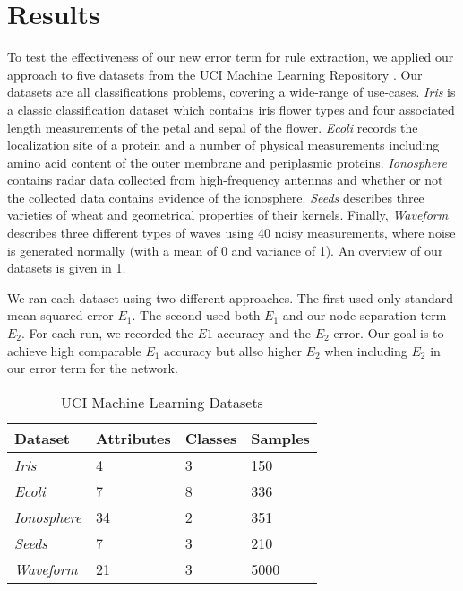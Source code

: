 \section{Results}
\label{sec:results}

To test the effectiveness of our new error term for rule extraction,
we applied our approach to five 
datasets from the UCI Machine Learning Repository \cite{uci}. Our
datasets are all classifications problems, covering a wide-range of
use-cases. \textit{Iris} is a classic classification dataset which
contains iris flower types and four associated length
measurements of the petal and sepal of the flower. \textit{Ecoli}
records the localization site of a protein and a number of
physical measurements including amino acid content of the outer membrane
and periplasmic proteins. \textit{Ionosphere} contains radar data collected
from high-frequency antennas and whether or not the collected data
contains evidence of the ionosphere. \textit{Seeds} describes three
varieties of wheat and geometrical properties of their kernels.
Finally, \textit{Waveform} describes three different types of waves
using 40 noisy measurements, where noise is generated normally
(with a mean of 0 and variance of 1).
An overview of our datasets is given in \ref{tab:datasets}.

We ran each dataset using two different approaches. The first
used only standard mean-squared error $E_1$. The second used both
$E_1$ and our node separation term $E_2$. For each run, we recorded
the $E1$ accuracy and the $E_2$ error. Our goal is to achieve
high comparable $E_1$ accuracy but allso higher $E_2$ when including
$E_2$ in our error term for the network.

\begin{table}[]
  \centering
\begin{tabular}{@{}llll@{}}
\toprule
Dataset             & Attributes & Classes & Samples \\ \midrule
\textit{Iris}       & 4          & 3       & 150     \\
\textit{Ecoli}      & 7          & 8       & 336     \\
\textit{Ionosphere} & 34         & 2       & 351     \\
\textit{Seeds}      & 7          & 3       & 210     \\
\textit{Waveform}   & 21         & 3       & 5000    \\ \bottomrule
\end{tabular}
\caption{UCI Machine Learning Datasets }
\label{tab:datasets}
\end{table}

